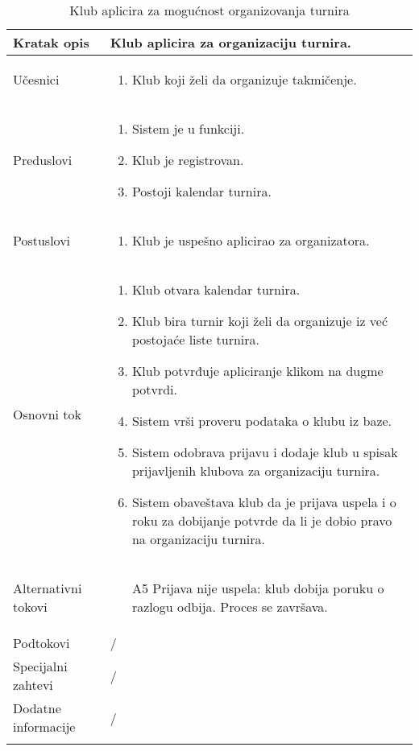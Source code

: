 \documentclass{article}
\begin{document}
\begin{longtable}{| p{} | p{} |} 
\hline
    Kratak opis & Klub aplicira za organizaciju turnira.\\ 
\hline    
    Učesnici & \begin{enumerate}
        \item Klub koji želi da organizuje takmičenje.
    \end{enumerate}
    \\
\hline
   Preduslovi & \begin{enumerate}
       \item Sistem je u funkciji.
       \item Klub je registrovan.
       \item Postoji kalendar turnira.
   \end{enumerate}\\
\hline  
    Postuslovi & \begin{enumerate}
        \item Klub je uspešno aplicirao za organizatora.
    \end{enumerate}\\
\hline
    Osnovni tok & \begin{enumerate}
        \item Klub otvara kalendar turnira.
        \item Klub bira turnir koji želi da organizuje iz već postojaće liste turnira.
        \item Klub potvrđuje apliciranje klikom na dugme potvrdi. 
        \item Sistem vrši proveru podataka o klubu iz baze.
        \item Sistem odobrava prijavu i dodaje klub u spisak prijavljenih klubova za organizaciju turnira.
        \item Sistem obaveštava klub da je prijava uspela i o roku za dobijanje potvrde da li je dobio pravo na organizaciju turnira.
    \end{enumerate}\\
\hline
    Alternativni tokovi & \begin{itemize}
        \item[A5] Prijava nije uspela: klub dobija poruku o razlogu odbija. Proces se završava.
    \end{itemize}\\
\hline
    Podtokovi & /\\
\hline
    Specijalni zahtevi & /\\
\hline
    Dodatne informacije & / \\
\hline 
\caption{Klub aplicira za mogućnost organizovanja turnira} 
\end{longtable}
\end{document}
